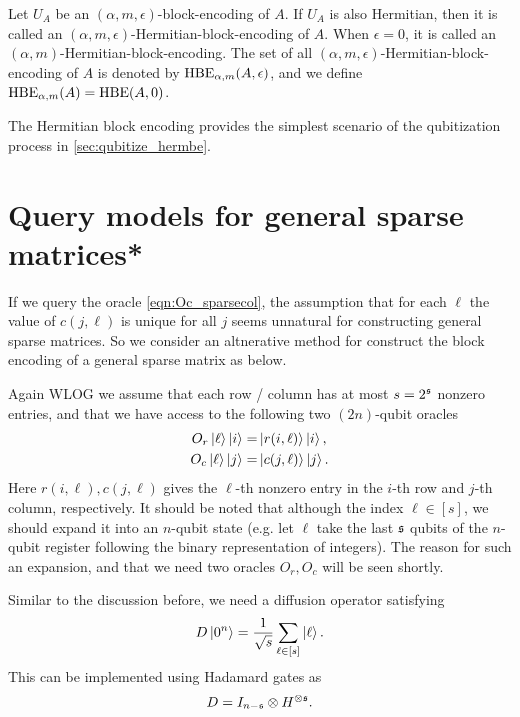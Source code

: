 \begin{defn} Let $U_A$ be an $(\alpha, m, \epsilon)$-block-encoding of $A$. If $U_A$ is also Hermitian, then it is called an  $(\alpha, m, \epsilon)$-Hermitian-block-encoding of $A$. When $\epsilon=0$, it is called an $(\alpha, m)$-Hermitian-block-encoding.
The set of all $(\alpha, m, \epsilon)$-Hermitian-block-encoding of $A$ is denoted by $\operatorname{HBE}_{\alpha,m}(A,\epsilon)$, and we define $\operatorname{HBE}_{\alpha,m}(A)=\operatorname{HBE}(A,0)$.
\end{defn}


The Hermitian block encoding provides the simplest scenario of the qubitization process in \cref{sec:qubitize_hermbe}.



\section{Query models for general sparse matrices*}\label{sec:query_general}

If we query the oracle \eqref{eqn:Oc_sparsecol}, the assumption that for each $\ell$ the value of $c(j,\ell)$ is unique for all $j$ seems unnatural for constructing general sparse matrices.
So we consider an altnerative method for construct the block encoding of a general sparse matrix as below.

Again WLOG we assume that each row / column has at most $s=2^{\mathfrak{s}}$ nonzero entries, and that we have access to the following two $(2n)$-qubit oracles
\begin{equation}
\begin{aligned}
O_r\ket{\ell}\ket{i}=&\ket{r(i,\ell)}\ket{i},\\
O_c\ket{\ell}\ket{j}=&\ket{c(j,\ell)}\ket{j}.
\end{aligned}
\end{equation}
Here $r(i,\ell),c(j,\ell)$ gives the $\ell$-th nonzero entry in the $i$-th row and $j$-th column, respectively.
It should be noted that although the index $\ell\in[s]$, we should expand it into an $n$-qubit state (e.g. let $\ell$ take the last $\mathfrak{s}$ qubits of the $n$-qubit register following the binary representation of integers).
The reason for such an expansion, and that we need two oracles $O_r,O_c$ will be seen shortly.

Similar to the discussion before, we need a diffusion operator satisfying
\begin{equation}
D\ket{0^{n}}=\frac{1}{\sqrt{s}}\sum_{\ell\in[s]} \ket{\ell}.
\end{equation}
This can be implemented using Hadamard gates as 
\begin{equation}
D=I_{n-\mathfrak{s}}\otimes H^{\otimes \mathfrak{s}}. 
\label{eqn:diffusion_sparse}
\end{equation}


